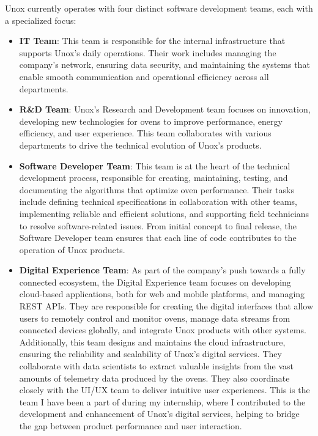 Unox currently operates with four distinct software development teams, each with a specialized focus:
\begin{itemize}
    \item \textbf{IT Team}: This team is responsible for the internal infrastructure that supports Unox's daily operations. Their work includes managing the company's network, ensuring data security, and maintaining the systems that enable smooth communication and operational efficiency across all departments.

    \item \textbf{R\&D Team}: Unox's Research and Development team focuses on innovation, developing new technologies for ovens to improve performance, energy efficiency, and user experience. This team collaborates with various departments to drive the technical evolution of Unox's products.

    \item \textbf{Software Developer Team}: This team is at the heart of the technical development process, responsible for creating, maintaining, testing, and documenting the algorithms that optimize oven performance. Their tasks include defining technical specifications in collaboration with other teams, implementing reliable and efficient solutions, and supporting field technicians to resolve software-related issues. From initial concept to final release, the Software Developer team ensures that each line of code contributes to the operation of Unox products.

    \item \textbf{Digital Experience Team}: As part of the company's push towards a fully connected ecosystem, the Digital Experience team focuses on developing cloud-based applications, both for web and mobile platforms, and managing REST APIs. They are responsible for creating the digital interfaces that allow users to remotely control and monitor ovens, manage data streams from connected devices globally, and integrate Unox products with other systems. Additionally, this team designs and maintains the cloud infrastructure, ensuring the reliability and scalability of Unox's digital services. They collaborate with data scientists to extract valuable insights from the vast amounts of telemetry data produced by the ovens. They also coordinate closely with the UI/UX team to deliver intuitive user experiences.
    This is the team I have been a part of during my internship, where I contributed to the development and enhancement of Unox's digital services, helping to bridge the gap between product performance and user interaction.
\end{itemize}

